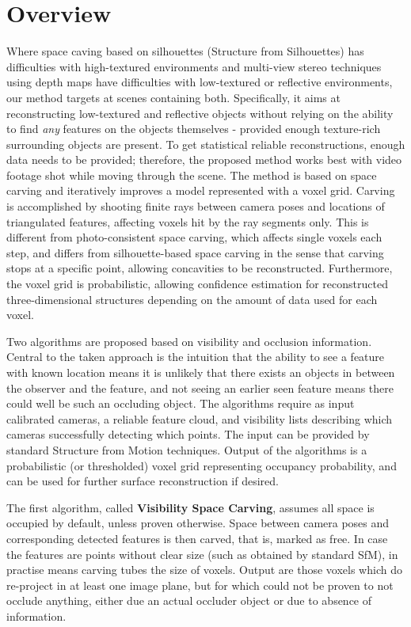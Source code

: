 
\section{Overview}  \label{method-overview}
Where space caving based on silhouettes (Structure from Silhouettes) has difficulties with high-textured environments and multi-view stereo techniques using depth maps have difficulties with low-textured or reflective environments, our method targets at scenes containing both. Specifically, it aims at reconstructing low-textured and reflective objects without relying on the ability to find \emph{any} features on the objects themselves - provided enough texture-rich surrounding objects are present. To get statistical reliable reconstructions, enough data needs to be provided; therefore, the proposed method works best with video footage shot while moving through the scene. The method is based on space carving and iteratively improves a model represented with a voxel grid. Carving is accomplished by shooting finite rays between camera poses and locations of triangulated features, affecting voxels hit by the ray segments only. This is different from photo-consistent space carving, which affects single voxels each step, and differs from silhouette-based space carving in the sense that carving stops at a specific point, allowing concavities to be reconstructed. Furthermore, the voxel grid is probabilistic, allowing confidence estimation for reconstructed three-dimensional structures depending on the amount of data used for each voxel.

Two algorithms are proposed based on visibility and occlusion information. Central to the taken approach is the intuition that the ability to see a feature with known location means it is unlikely that there exists an objects in between the observer and the feature, and not seeing an earlier seen feature means there could well be such an occluding object. The algorithms require as input calibrated cameras, a reliable feature cloud, and visibility lists describing which cameras successfully detecting which points. The input can be provided by standard Structure from Motion techniques. Output of the algorithms is a probabilistic (or thresholded) voxel grid representing occupancy probability, and can be used for further surface reconstruction if desired.

The first algorithm, called \textbf{Visibility Space Carving}, assumes all space is occupied by default, unless proven otherwise. Space between camera poses and corresponding detected features is then carved, that is, marked as free. In case the features are points without clear size (such as obtained by standard SfM), in practise means carving tubes the size of voxels. Output are those voxels which do re-project in at least one image plane, but for which could not be proven to not occlude anything, either due an actual occluder object or due to absence of information. 

